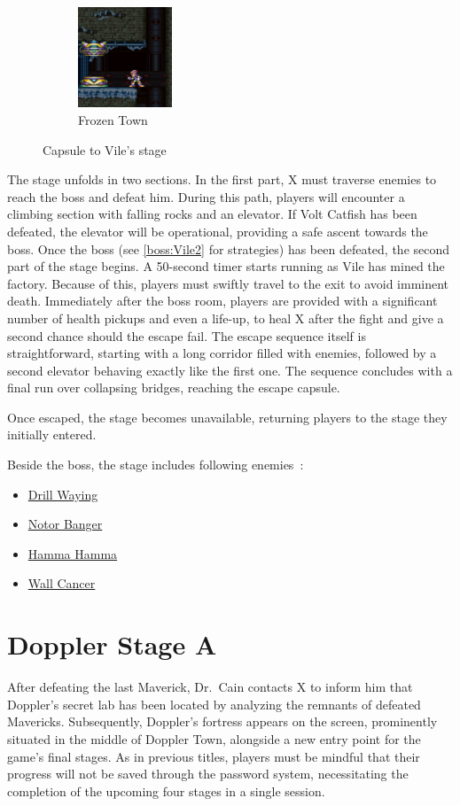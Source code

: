 \begin{figure}[htp]
\begin{subfigure}{\linewidth}
		\includegraphics[height=3cm]{figures/X3/Blizzard_buffalo/Vile_2.jpg}
		\caption{Frozen Town}
	\end{subfigure}
	\caption{Capsule to Vile's stage}
\end{figure}

The stage unfolds in two sections. In the first part, X must traverse enemies to reach the boss and defeat him. During this path, players will encounter a climbing section with falling rocks and an elevator. If Volt Catfish has been defeated, the elevator will be operational, providing a safe ascent towards the boss. Once the boss (see \ref{boss:Vile2} for strategies) has been defeated, the second part of the stage begins. A 50-second timer starts running as Vile has mined the factory. Because of this, players must swiftly travel to the exit to avoid imminent death. Immediately after the boss room, players are provided with a significant number of health pickups and even a life-up, to heal X after the fight and give a second chance should the escape fail. The escape sequence itself is straightforward, starting with a long corridor filled with enemies, followed by a second elevator behaving exactly like the first one. The sequence concludes with a final run over collapsing bridges, reaching the escape capsule.

Once escaped, the stage becomes unavailable, returning players to the stage they initially entered.

Beside the boss, the stage includes following enemies~\cite{wiki:Vile_stage}:
\begin{itemize}
	\item \hyperlink{enem:Drill_Waying}{Drill Waying}
	\item \hyperlink{enem:Notor_Banger}{Notor Banger}
	\item \hyperlink{enem:Hamma_Hamma}{Hamma Hamma}
	\item \hyperlink{enem:Wall_Cancer}{Wall Cancer}
\end{itemize} 	 	



\section{Doppler Stage A}
After defeating the last Maverick, Dr.~Cain contacts X to inform him that Doppler's secret lab has been located by analyzing the remnants of defeated Mavericks. Subsequently, Doppler's fortress appears on the screen, prominently situated in the middle of Doppler Town, alongside a new entry point for the game's final stages. As in previous titles, players must be mindful that their progress will not be saved through the password system, necessitating the completion of the upcoming four stages in a single session.

